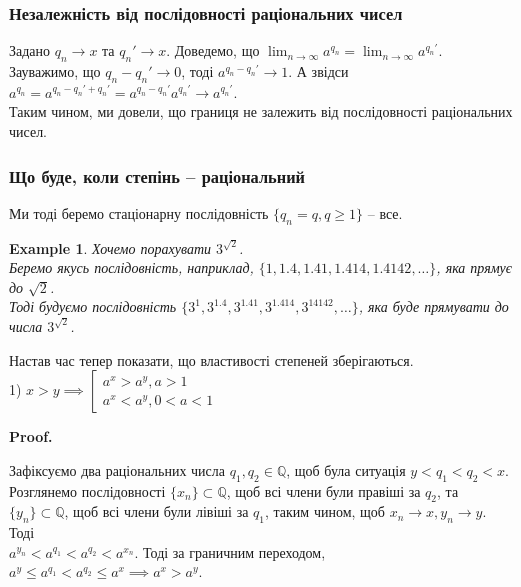 \documentclass[a4paper, 14pt]{article}
\makeatletter
\def\qed{$\blacksquare$}
\theoremstyle{theoremdd}
\theoremstyle{theoremdd}
\theoremstyle{theoremdd}
\theoremstyle{theoremdd}
\newtheorem{example}[theorem]{Example}
\theoremstyle{theoremdd}
\theoremstyle{theoremdd}
\theoremstyle{theoremdd}
\theoremstyle{theoremdd}
\renewenvironment{proof}[1][Proof.\\]{\par
\pushQED{\hfill \qed}%
\normalfont \topsep6\p@\@plus6\p@\relax
\trivlist
\item\relax
{\bfseries
#1\@addpunct{.}}\hspace\labelsep\ignorespaces
}{%
\popQED\endtrivlist\@endpefalse
}
\makeatother
\begin{document}
\subsubsection*{Незалежність від послідовності раціональних чисел}
Задано $q_n \to x$ та $q_n' \to x$. Доведемо, що $\displaystyle\lim_{n \to \infty} a^{q_n} = \displaystyle\lim_{n \to \infty} a^{q_n'}$.\\
\iffalse
Зауважимо, що $q_n - q_n' \to 0$, тоді для $\varepsilon = 1: \exists N: \forall n \geq N: |q_n-q_n'| < 1$.\\
Тоді $|a^{q_n} - a^{q_n'}| = a^{q_n'}|a^{q_n-q_n'}-1| \leq a^{q_n'} 2|q_n-q_n'|(a-1) \overset{n \to \infty}{\longrightarrow} 0$.\\
Отже, дійсно,  $\displaystyle\lim_{n \to \infty} a^{q_n} = \displaystyle\lim_{n \to \infty} a^{q_n'}$, що підтверджує незалежність.
\fi
Зауважимо, що $q_n - q_n' \to 0$, тоді $a^{q_n - q_n'} \to 1$. А звідси $a^{q_n} = a^{q_n - q_n' + q_n'} = a^{q_n - q_n'} a^{q_n'} \to a^{q_n'}$.\\
Таким чином, ми довели, що границя не залежить від послідовності раціональних чисел.

\subsubsection*{Що буде, коли степінь -- раціональний}
Ми тоді беремо стаціонарну послідовність $\{q_n = q, q \geq 1\}$ -- все.

\begin{example}
Хочемо порахувати $3^{\sqrt{2}}$. \\ Беремо якусь послідовність, наприклад, $\{1,1.4,1.41,1.414,1.4142,\dots\}$, яка прямує до $\sqrt{2}$.\\
Тоді будуємо послідовність $\{3^1,3^{1.4},3^{1.41},3^{1.414},3^{14142},\dots\}$, яка буде прямувати до числа $3^{\sqrt{2}}$.
\\
\end{example}

Настав час тепер показати, що властивості степеней зберігаються.\\
1) $x > y \implies \left[ \begin{gathered} a^{x} > a^{y}, a>1 \\ a^{x} < a^{y}, 0<a<1 \end{gathered} \right.$
\begin{proof}
Зафіксуємо два раціональних числа $q_1,q_2 \in \mathbb{Q}$, щоб була ситуація $y < q_1 < q_2 < x$.\\
Розглянемо послідовності $\{x_n\} \subset \mathbb{Q}$, щоб всі члени були правіші за $q_2$, та $\{y_n\} \subset \mathbb{Q}$, щоб всі члени були лівіші за $q_1$, таким чином, щоб $x_n \to x, y_n \to y$. Тоді\\
$a^{y_n} < a^{q_1} < a^{q_2} < a^{x_n}$. Тоді за граничним переходом, $a^y \leq a^{q_1} < a^{q_2} \leq a^x \implies a^x > a^y$.
\end{proof}
\end{document}
